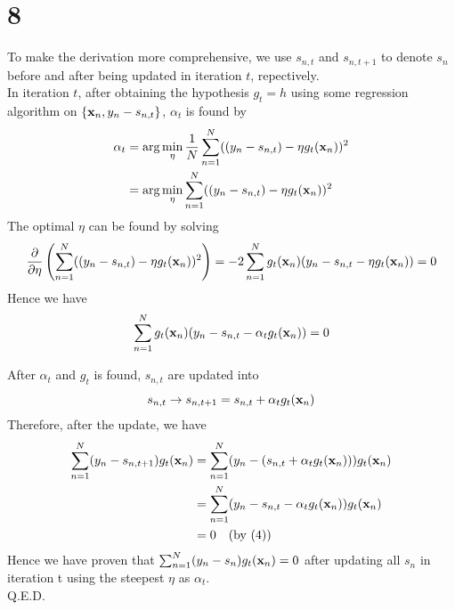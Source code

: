 \documentclass[11pt]{article}
\theoremstyle{definition}
\begin{document}
\section*{8}
To make the derivation more comprehensive, we use $s_{n, t}$ and $s_{n, t + 1}$ to denote $s_n$ before and after being updated in iteration $t$, repectively. \\ 
In iteration $t$, after obtaining the hypothesis $g_t = h$ using some regression algorithm on $\{\vb{x}_n, y_n - s_{n, t}\}$, $\alpha_t$ is found by 
\begin{align*}
  \alpha_t &= \arg\min_\eta\frac{1}{N}\sum^N_{n = 1}((y_n - s_{n, t}) - \eta g_t(\vb{x}_n))^2 \\ 
  &= \arg\min_\eta\sum^N_{n = 1}((y_n - s_{n, t}) - \eta g_t(\vb{x}_n))^2 \\ 
\end{align*}
The optimal $\eta$ can be found by solving 
\[
  \pdv{}{\eta}\left(\sum^N_{n = 1}((y_n - s_{n, t}) - \eta g_t(\vb{x}_n))^2\right) = -2\sum_{n = 1}^Ng_t(\vb{x}_n)(y_n - s_{n, t} - \eta g_t(\vb{x}_n)) = 0
\]
Hence we have
\begin{equation}
  \sum_{n = 1}^Ng_t(\vb{x}_n)(y_n - s_{n, t} - \alpha_t g_t(\vb{x}_n)) = 0
\end{equation}
\par 
After $\alpha_t$ and $g_t$ is found, $s_{n, t}$ are updated into
\[
  s_{n, t}\rightarrow s_{n, t + 1} = s_{n, t} + \alpha_tg_t(\vb{x}_n)
\]
Therefore, after the update, we have
\begin{align*}
  \sum^N_{n = 1}(y_n - s_{n, t + 1})g_t(\vb{x}_n) &= \sum^N_{n = 1}(y_n - (s_{n, t} + \alpha_tg_t(\vb{x}_n)))g_t(\vb{x}_n) \\ 
  &= \sum^N_{n = 1}(y_n - s_{n, t} - \alpha_tg_t(\vb{x}_n))g_t(\vb{x}_n) \\ 
  &= 0\quad(\text{by (4)})
\end{align*}
Hence we have proven that $\sum^N_{n = 1}(y_n - s_n)g_t(\vb{x}_n) = 0$ after updating all $s_n$ in iteration t using the steepest $\eta$ as $\alpha_t$. \\
Q.E.D.
\newpage
\end{document}
